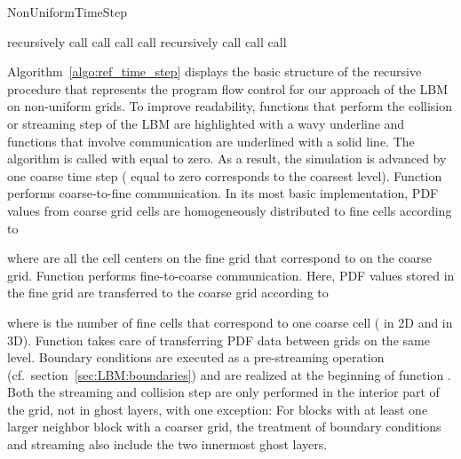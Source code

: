 \documentclass[final,leqno,onefignum,onetabnum]{siamltex1213}
\begin{document}
\begin{algorithm}[tbp]
\footnotesize
\caption{NonUniformTimeStep}
\label{algo:ref_time_step}
\DontPrintSemicolon
{}
{
\If{}
{
recursively call \RefStep{}
}
\If{}
{
call \Explosion{}
}
call \Communication{}
\label{algo:ref_time_step:1st_stream}
\If{}
{
call \Coalescence{}
}
\If{}
{
\Return{}
}
\label{algo:ref_time_step:2nd_collide}
\If{}
{
recursively call \RefStep{}
}
call \Communication{}
\If{}
{
call \Coalescence{}
}
}
\end{algorithm}

Algorithm~\ref{algo:ref_time_step} displays the basic structure of the recursive procedure that
represents the program flow control for our approach of the LBM on non-uniform grids.
To improve readability, functions that perform the collision or streaming step of the LBM are highlighted with a wavy underline
and functions that involve communication are underlined with a solid line.
The algorithm is called with  equal to zero.
As a result, the simulation is advanced by one coarse time step ( equal to zero corresponds to the coarsest level).
Function  performs coarse-to-fine communication.
In its most basic implementation, PDF values from coarse grid cells are homogeneously distributed to fine cells according to

where  are all the cell centers on the fine grid that correspond to  on the coarse grid.
Function  performs fine-to-coarse communication.
Here, PDF values stored in the fine grid are transferred to the coarse grid according to

where  is the number of fine cells that correspond to one coarse cell ( in 2D and  in 3D).
Function  takes care of transferring PDF data between grids on the same level.
Boundary conditions are executed as a pre-streaming operation (cf.\ section~\ref{sec:LBM:boundaries}) and are realized at the beginning of function .
Both the streaming and collision step are only performed in the interior part of the grid, not in ghost layers, with one exception:
For blocks with at least one larger neighbor block with a coarser grid, the treatment of boundary conditions and streaming also include the two innermost ghost layers.
\end{document}

